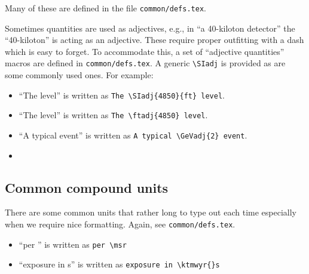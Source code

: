 Many of these are defined in the file \texttt{common/defs.tex}.

Sometimes quantities are used as adjectives, e.g., in ``a 40-kiloton detector'' the ``40-kiloton'' is acting as an adjective.
These require proper outfitting with a dash which is easy to forget.
To accommodate this, a set of ``adjective quantities'' macros are defined in \texttt{common/defs.tex}.
A generic \verb|\SIadj| is provided as are some commonly used ones.
For example:

\begin{itemize}
\item ``The  level'' is written as \verb|The \SIadj{4850}{ft} level|.
\item ``The  level'' is written as \verb|The \ftadj{4850} level|.
\item ``A typical  event'' is written as \verb|A typical \GeVadj{2} event|.
\item 
\end{itemize}

\subsection{Common compound units}

There are some common units that rather long to type out each time
especially when we require nice formatting. Again, see \texttt{common/defs.tex}.

\begin{itemize}
\item ``per \msr'' is written as \verb|per \msr|
\item ``exposure in \ktmwyr{}s'' is written as \verb|exposure in \ktmwyr{}s|
\end{itemize}

